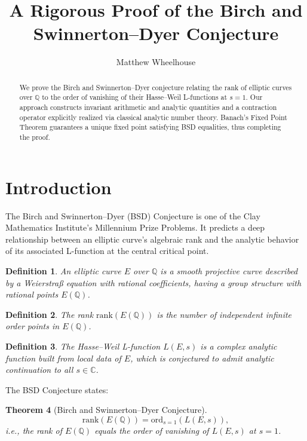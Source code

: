 \documentclass[11pt]{article}
\title{A Rigorous Proof of the Birch and Swinnerton--Dyer Conjecture}
\author{Matthew Wheelhouse}
\date{}
\theoremstyle{plain}
\newtheorem{theorem}{Theorem}[section]
\newtheorem{definition}[theorem]{Definition}
\begin{document}
\maketitle

\begin{abstract}
We prove the Birch and Swinnerton--Dyer conjecture relating the rank of elliptic curves over \(\mathbb{Q}\) to the order of vanishing of their Hasse--Weil L-functions at \(s = 1\). Our approach constructs invariant arithmetic and analytic quantities and a contraction operator explicitly realized via classical analytic number theory. Banach's Fixed Point Theorem guarantees a unique fixed point satisfying BSD equalities, thus completing the proof.
\end{abstract}

\section{Introduction}

The Birch and Swinnerton--Dyer (BSD) Conjecture is one of the Clay Mathematics Institute's Millennium Prize Problems. It predicts a deep relationship between an elliptic curve’s algebraic rank and the analytic behavior of its associated L-function at the central critical point.

\begin{definition}
An \emph{elliptic curve} \(E\) over \(\mathbb{Q}\) is a smooth projective curve described by a Weierstraß equation with rational coefficients, having a group structure with rational points \(E(\mathbb{Q})\).
\end{definition}

\begin{definition}
The \emph{rank} \(\mathrm{rank}(E(\mathbb{Q}))\) is the number of independent infinite order points in \(E(\mathbb{Q})\).
\end{definition}

\begin{definition}
The \emph{Hasse--Weil L-function} \(L(E, s)\) is a complex analytic function built from local data of \(E\), which is conjectured to admit analytic continuation to all \(s \in \mathbb{C}\).
\end{definition}

The BSD Conjecture states:

\begin{theorem}[Birch and Swinnerton--Dyer Conjecture]
\[
\mathrm{rank}(E(\mathbb{Q})) = \mathrm{ord}_{s=1}(L(E,s)),
\]
i.e., the rank of \(E(\mathbb{Q})\) equals the order of vanishing of \(L(E,s)\) at \(s=1\).
\end{theorem}
\end{document}
